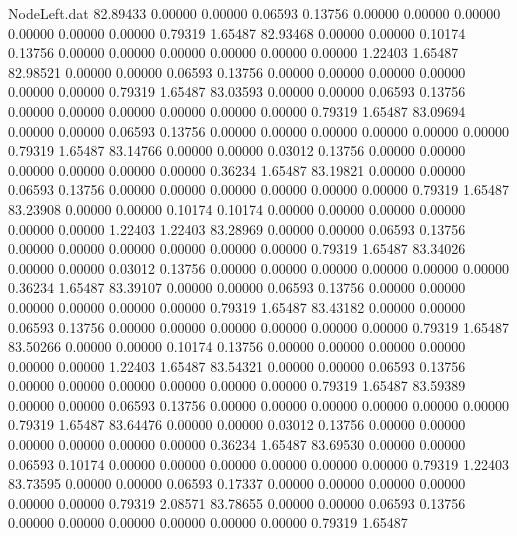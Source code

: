 \begin{filecontents}{NodeLeft.dat}
  82.89433    0.00000    0.00000     0.06593    0.13756    0.00000    0.00000    0.00000    0.00000    0.00000    0.00000    0.79319    1.65487
  82.93468    0.00000    0.00000     0.10174    0.13756    0.00000    0.00000    0.00000    0.00000    0.00000    0.00000    1.22403    1.65487
  82.98521    0.00000    0.00000     0.06593    0.13756    0.00000    0.00000    0.00000    0.00000    0.00000    0.00000    0.79319    1.65487
  83.03593    0.00000    0.00000     0.06593    0.13756    0.00000    0.00000    0.00000    0.00000    0.00000    0.00000    0.79319    1.65487
  83.09694    0.00000    0.00000     0.06593    0.13756    0.00000    0.00000    0.00000    0.00000    0.00000    0.00000    0.79319    1.65487
  83.14766    0.00000    0.00000     0.03012    0.13756    0.00000    0.00000    0.00000    0.00000    0.00000    0.00000    0.36234    1.65487
  83.19821    0.00000    0.00000     0.06593    0.13756    0.00000    0.00000    0.00000    0.00000    0.00000    0.00000    0.79319    1.65487
  83.23908    0.00000    0.00000     0.10174    0.10174    0.00000    0.00000    0.00000    0.00000    0.00000    0.00000    1.22403    1.22403
  83.28969    0.00000    0.00000     0.06593    0.13756    0.00000    0.00000    0.00000    0.00000    0.00000    0.00000    0.79319    1.65487
  83.34026    0.00000    0.00000     0.03012    0.13756    0.00000    0.00000    0.00000    0.00000    0.00000    0.00000    0.36234    1.65487
  83.39107    0.00000    0.00000     0.06593    0.13756    0.00000    0.00000    0.00000    0.00000    0.00000    0.00000    0.79319    1.65487
  83.43182    0.00000    0.00000     0.06593    0.13756    0.00000    0.00000    0.00000    0.00000    0.00000    0.00000    0.79319    1.65487
  83.50266    0.00000    0.00000     0.10174    0.13756    0.00000    0.00000    0.00000    0.00000    0.00000    0.00000    1.22403    1.65487
  83.54321    0.00000    0.00000     0.06593    0.13756    0.00000    0.00000    0.00000    0.00000    0.00000    0.00000    0.79319    1.65487
  83.59389    0.00000    0.00000     0.06593    0.13756    0.00000    0.00000    0.00000    0.00000    0.00000    0.00000    0.79319    1.65487
  83.64476    0.00000    0.00000     0.03012    0.13756    0.00000    0.00000    0.00000    0.00000    0.00000    0.00000    0.36234    1.65487
  83.69530    0.00000    0.00000     0.06593    0.10174    0.00000    0.00000    0.00000    0.00000    0.00000    0.00000    0.79319    1.22403
  83.73595    0.00000    0.00000     0.06593    0.17337    0.00000    0.00000    0.00000    0.00000    0.00000    0.00000    0.79319    2.08571
  83.78655    0.00000    0.00000     0.06593    0.13756    0.00000    0.00000    0.00000    0.00000    0.00000    0.00000    0.79319    1.65487

\end{filecontents}
